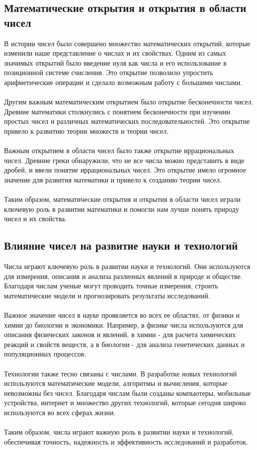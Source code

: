 \documentclass{article}
\begin{document}
\subsection{Математические открытия и открытия в области чисел}
В истории чисел было совершено множество математических открытий, которые изменили наше представление о числах и их свойствах. Одним из самых значимых открытий было введение нуля как числа и его использование в позиционной системе счисления. Это открытие позволило упростить арифметические операции и сделало возможным работу с большими числами.\\
~\\
Другим важным математическим открытием было открытие бесконечности чисел. Древние математики столкнулись с понятием бесконечности при изучении простых чисел и различных математических последовательностей. Это открытие привело к развитию теории множеств и теории чисел.\\
~\\
Важным открытием в области чисел было также открытие иррациональных чисел. Древние греки обнаружили, что не все числа можно представить в виде дробей, и ввели понятие иррациональных чисел. Это открытие имело огромное значение для развития математики и привело к созданию теории чисел.\\
~\\
Таким образом, математические открытия и открытия в области чисел играли ключевую роль в развитии математики и помогли нам лучше понять природу чисел и их свойства.
\subsection{Влияние чисел на развитие науки и технологий}
Числа играют ключевую роль в развитии науки и технологий. Они используются для измерения, описания и анализа различных явлений в природе и обществе. Благодаря числам ученые могут проводить точные измерения, строить математические модели и прогнозировать результаты исследований.\\
~\\
Важное значение чисел в науке проявляется во всех ее областях, от физики и химии до биологии и экономики. Например, в физике числа используются для описания физических законов и явлений, в химии - для расчета химических реакций и свойств веществ, а в биологии - для анализа генетических данных и популяционных процессов.\\
~\\
Технологии также тесно связаны с числами. В разработке новых технологий используются математические модели, алгоритмы и вычисления, которые невозможны без чисел. Благодаря числам были созданы компьютеры, мобильные устройства, интернет и множество других технологий, которые сегодня широко используются во всех сферах жизни.\\
~\\
Таким образом, числа играют важную роль в развитии науки и технологий, обеспечивая точность, надежность и эффективность исследований и разработок.\\
~\\
\end{document}
